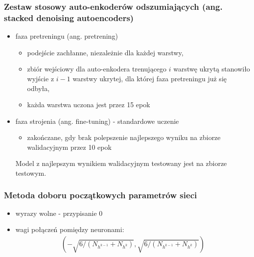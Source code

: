 \documentclass{beamer}
\begin{document}


\begin{frame}
\frametitle{Zestaw stosowy auto-enkoderów odszumiających (ang. stacked denoising autoencoders)}

\begin{itemize}
    \item faza pretreningu (ang. pretrening)
        \begin{itemize}
            \item podejście zachłanne, niezależnie dla każdej warstwy, 
            \item zbiór wejściowy dla auto-enkodera trenującego $i$ warstwę ukrytą
                stanowiło wyjście z $i-1$ warstwy ukrytej, dla której faza pretreningu
                już się odbyła,
            \item każda warstwa uczona jest przez 15 epok
        \end{itemize}
    \item faza strojenia (ang. fine-tuning) - standardowe uczenie
        \begin{itemize}
            \item zakończane, gdy brak polepszenie najlepszego 
                wyniku na zbiorze walidacyjnym przez 10 epok
        \end{itemize}
    
    Model z najlepszym wynikiem walidacyjnym testowany jest na zbiorze testowym.
        
\end{itemize}

\end{frame}


\begin{frame}
\frametitle{Metoda doboru początkowych parametrów sieci}

\begin{itemize}
    \item wyrazy wolne - przypisanie $0$
    \item wagi połączeń pomiędzy neuronami:
    \begin{align*}
    	(-\sqrt{6 / (N_{h^{k-1}} + N_{h^{k}})}, \sqrt{6 / (N_{h^{k-1}} + N_{h^{k}})})
    \end{align*}
     
\end{itemize}

\end{frame}
\end{document}
